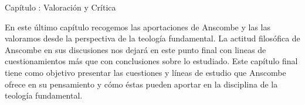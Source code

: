 \documentclass[11pt]{article}
\begin{document}
{\begin{spacing}{1.5}
{\LARGE Capítulo : 
Valoración y Crítica}

\begin{spacing}{1}
En este último capítulo recogemos las aportaciones de Anscombe y las las valoramos desde la perspectiva de la teología fundamental. La actitud filosófica de Anscombe en sus discusiones nos dejará en este punto final con lineas de cuestionamientos más que con conclusiones sobre lo estudiado. Este capítulo final tiene como objetivo presentar las cuestiones y líneas de estudio que Anscombe ofrece en su pensamiento y cómo éstas pueden aportar en la disciplina de la teología fundamental.
\end{spacing}

\end{spacing}
}
\end{document}
